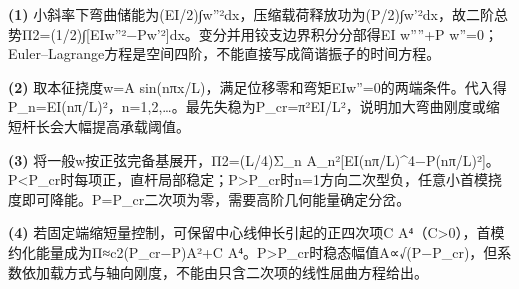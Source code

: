 \par\noindent\textbf{(1)} 小斜率下弯曲储能为(EI/2)∫w''²dx，压缩载荷释放功为(P/2)∫w'²dx，故二阶总势Π2=(1/2)∫[EIw''²−Pw'²]dx。变分并用铰支边界积分分部得EI w''''+P w''=0；Euler–Lagrange方程是空间四阶，不能直接写成简谐振子的时间方程。
\par\noindent\textbf{(2)} 取本征挠度w=A sin(nπx/L)，满足位移零和弯矩EIw''=0的两端条件。代入得P\_n=EI(nπ/L)²，n=1,2,…。最先失稳为P\_cr=π²EI/L²，说明加大弯曲刚度或缩短杆长会大幅提高承载阈值。
\par\noindent\textbf{(3)} 将一般w按正弦完备基展开，Π2=(L/4)Σ\_n A\_n²[EI(nπ/L)\textasciicircum{}4−P(nπ/L)²]。P<P\_cr时每项正，直杆局部稳定；P>P\_cr时n=1方向二次型负，任意小首模挠度即可降能。P=P\_cr二次项为零，需要高阶几何能量确定分岔。
\par\noindent\textbf{(4)} 若固定端缩短量控制，可保留中心线伸长引起的正四次项C A⁴（C>0），首模约化能量成为Π≈c2(P\_cr−P)A²+C A⁴。P>P\_cr时稳态幅值A∝√(P−P\_cr)，但系数依加载方式与轴向刚度，不能由只含二次项的线性屈曲方程给出。
